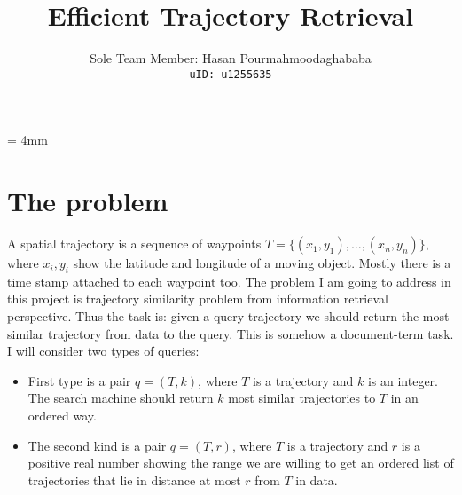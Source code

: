 \documentclass[10pt, twocolumn]{myclass}
\begin{document}
\title{Efficient Trajectory Retrieval}

\author{Sole Team Member: Hasan Pourmahmoodaghababa \\ %
\texttt{uID: u1255635}}


\baselineskip = 4mm

\maketitle

\section{The problem} 

A spatial trajectory is a sequence of waypoints $T=\{(x_1, y_1), \ldots, (x_n, y_n)\}$, where $x_i, y_i$ show the latitude and longitude of a moving object. Mostly there is a time stamp attached to each waypoint too. %
The problem I am going to address in this project is trajectory similarity problem from information retrieval perspective. Thus the task is: given a query trajectory we should return the most similar trajectory from data to the query. This is somehow a document-term task. I will consider two types of queries:
\begin{itemize}
\item First type is a pair $q=(T, k)$, where $T$ is a trajectory and $k$ is an integer. The search machine should return $k$ most similar trajectories to $T$ in an ordered way. \vspace{-1mm}
\item The second kind is a pair $q=(T, r)$, where $T$ is a trajectory and $r$ is a positive real number showing the range we are willing to get an ordered list of trajectories that lie in distance at most $r$ from $T$ in data.
\end{itemize}
\end{document}
